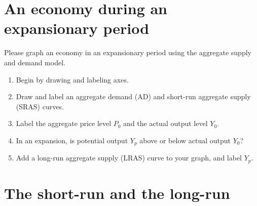 \documentclass[
    letterpaper,paper=portrait,fleqn,
    DIV=16,fontsize=12pt,twoside=semi,
    parskip=full-,
    headings=standardclasses]
{scrartcl}
\begin{document}
\vfill

\begin{center}
\end{center}

\clearpage

\section{An economy during an expansionary period\label{sec:expansion}}

Please graph an economy in an expansionary period using the aggregate supply and demand model.

\begin{enumerate}[font={\bfseries}]
\item Begin by drawing and labeling axes.
\item Draw and label an aggregate demand (AD) and short-run aggregate supply (SRAS) curves.
\item Label the aggregate price level $P_0$ and the actual output level $Y_0$.
\item In an expansion, is potential output $Y_p$ above or below actual output $Y_0$? \hfill \underline{\hspace{1.5in}}
\item Add a long-run aggregate supply (LRAS) curve to your graph, and label $Y_p$.
\end{enumerate}

\vfill

\begin{center}
\end{center}

\section{The short-run and the long-run}
\end{document}
